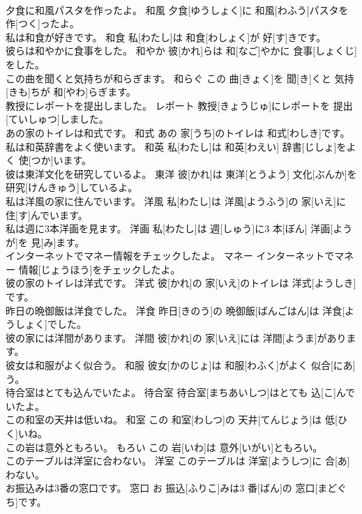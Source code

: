 \documentclass[8pt]{extreport}
\begin{document}
\begin{CJK}{UTF8}{min}
\\	夕食に和風パスタを作ったよ。	和風	夕食[ゆうしょく]に 和風[わふう]パスタを 作[つく]ったよ。	
\\	私は和食が好きです。	和食	私[わたし]は 和食[わしょく]が 好[す]きです。	
\\	彼らは和やかに食事をした。	和やか	彼[かれ]らは 和[なご]やかに 食事[しょくじ]をした。	
\\	この曲を聞くと気持ちが和らぎます。	和らぐ	この 曲[きょく]を 聞[き]くと 気持[きも]ちが 和[やわ]らぎます。	
\\	教授にレポートを提出しました。	レポート	教授[きょうじゅ]にレポートを 提出[ていしゅつ]しました。	
\\	あの家のトイレは和式です。	和式	あの 家[うち]のトイレは 和式[わしき]です。	
\\	私は和英辞書をよく使います。	和英	私[わたし]は 和英[わえい] 辞書[じしょ]をよく 使[つか]います。	
\\	彼は東洋文化を研究しているよ。	東洋	彼[かれ]は 東洋[とうよう] 文化[ぶんか]を 研究[けんきゅう]しているよ。	
\\	私は洋風の家に住んでいます。	洋風	私[わたし]は 洋風[ようふう]の 家[いえ]に 住[す]んでいます。	
\\	私は週に3本洋画を見ます。	洋画	私[わたし]は 週[しゅう]に3 本[ぼん] 洋画[ようが]を 見[み]ます。	
\\	インターネットでマネー情報をチェックしたよ。	マネー	インターネットでマネー 情報[じょうほう]をチェックしたよ。	
\\	彼の家のトイレは洋式です。	洋式	彼[かれ]の 家[いえ]のトイレは 洋式[ようしき]です。	
\\	昨日の晩御飯は洋食でした。	洋食	昨日[きのう]の 晩御飯[ばんごはん]は 洋食[ようしょく]でした。	
\\	彼の家には洋間があります。	洋間	彼[かれ]の 家[いえ]には 洋間[ようま]があります。	
\\	彼女は和服がよく似合う。	和服	彼女[かのじょ]は 和服[わふく]がよく 似合[にあ]う。	
\\	待合室はとても込んでいたよ。	待合室	待合室[まちあいしつ]はとても 込[こ]んでいたよ。	
\\	この和室の天井は低いね。	和室	この 和室[わしつ]の 天井[てんじょう]は 低[ひく]いね。	
\\	この岩は意外ともろい。	もろい	この 岩[いわ]は 意外[いがい]ともろい。	
\\	このテーブルは洋室に合わない。	洋室	このテーブルは 洋室[ようしつ]に 合[あ]わない。	
\\	お振込みは3番の窓口です。	窓口	お 振込[ふりこ]みは3 番[ばん]の 窓口[まどぐち]です。	

\end{CJK}
\end{document}
